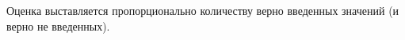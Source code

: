 \solutionSection

\markSection

Оценка выставляется пропорционально количеству верно введенных значений (и верно не введенных). 


